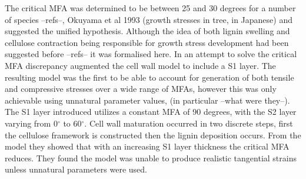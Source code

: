 The critical MFA was determined to be between
25 and 30 degrees for a number of species --refs--, Okuyama et al 1993 (growth
stresses in tree, in Japanese) and \cite{ISI:A1995QJ03000001} suggested the
unified hypothesis. Although the idea of both lignin swelling and cellulose
contraction being responsible for growth stress development had been suggested
before --refs-- it was formalised here. In an attempt to solve the critical MFA
discrepancy \cite{ISI:A1995QJ03000001} augmented the \cite{Barber_1964} cell wall
model to include a S1 layer. The resulting model was the first to be able to
account for generation of both tensile and compressive stresses over a wide
range of MFAs, however this was only achievable using unnatural parameter values, (in
particular --what were they--). The S1 layer introduced utilizes a constant MFA
of 90 degrees, with the S2 layer varying from 0$^{\circ}$ to 60$^{\circ}$. Cell wall maturation
occurred in two discrete steps, first the cellulose framework is constructed then
the lignin deposition occurs. From the model they showed that with an
increasing S1 layer thickness the critical MFA reduces. They found the model
was unable to produce realistic tangential strains unless unnatural parameters
were used.